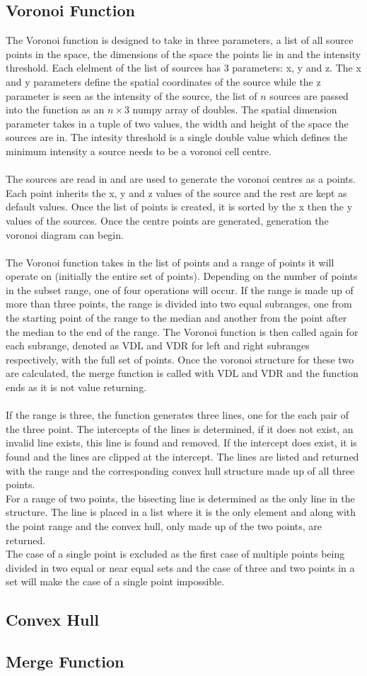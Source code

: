 \subsection{Voronoi Function}
The Voronoi function is designed to take in three parameters, a list of all source points in the space, the dimensions of the space the points lie in and the intensity threshold. Each elelment of the list of sources has 3 parameters: x, y and z. The x and y parameters define the spatial coordinates of the source while the z parameter is seen as the intensity of the source, the list of $n$ sources are passed into the function as an $n \times 3$ numpy array of doubles. The spatial dimension parameter takes in a tuple of two values, the width and height of the space the sources are in. The intesity threshold is a single double value which defines the minimum intensity a source needs to be a voronoi cell centre.
\\
\\
The sources are read in and are used to generate the voronoi centres as a points. Each point inherits the x, y and z values of the source and the rest are kept as default values. Once the list of points is created, it is sorted by the x then the y values of the sources. Once the centre points are generated, generation the voronoi diagram can begin.
\\
\\
The Voronoi function takes in the list of points and a range of points it will operate on (initially the entire set of points). Depending on the number of points in the subset range, one of four operations will occur. If the range is made up of more than three points, the range is divided into two equal subranges, one from the starting point of the range to the median and another from the point after the median to the end of the range. The Voronoi function is then called again for each subrange, denoted as VDL and VDR for left and right subranges respectively, with the full set of points. Once the voronoi structure for these two are calculated, the merge function is called with VDL and VDR and the function ends as it is not value returning.
\\
\\
If the range is three, the function generates three lines, one for the each pair of the three point. The intercepts of the lines is determined, if it does not exist, an invalid line exists, this line is found and removed. If the intercept does exist, it is found and the lines are clipped at the intercept. The lines are listed and returned with the range and the corresponding convex hull structure made up of all three points.
\\
For a range of two points, the bisecting line is determined as the only line in the structure. The line is placed in a list where it is the only element and along with the point range and the convex hull, only made up of the two points, are returned.
\\
The case of a single point is excluded as the first case of multiple points being divided in two equal or near equal sets and the case of three and two points in a set will make the case of a single point impossible.

\subsection{Convex Hull}
\subsection{Merge Function}